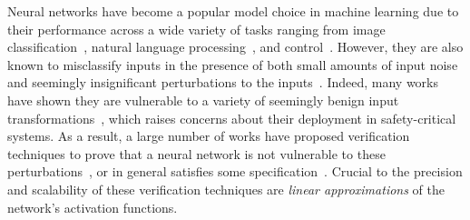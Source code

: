\declarecommand{}
\declarecommand{}
\declarecommand{}


Neural networks have become a popular model choice in machine learning due to
their performance across a wide variety of tasks ranging from image
classification~\cite{he2016deep}, natural language
processing~\cite{vaswani2017attention}, and
control~\cite{hu2020reach,JulianKO18}. However, they are also
known to misclassify inputs in the presence of both small amounts of input
noise and seemingly insignificant perturbations to the
inputs~\cite{szegedy2013intriguing}. Indeed, many works have shown they are
vulnerable to a variety of seemingly benign input
transformations~\cite{engstrom2019exploring,kanbak2018geometric,alzantot2018generating},
which raises concerns about their deployment in safety-critical systems.
As a result, a large number of works have proposed verification techniques to
prove that a neural network is not vulnerable to these
perturbations~\cite{SinghGPV19,WangPWYJ18,WengZCSHDBD18}, or in
general satisfies some
specification~\cite{KatzBDJK17,KatzHIJLLSTWZDK19,hu2020reach}. Crucial to the
precision and scalability of these verification techniques are \textit{linear
approximations} of the network's activation functions.



